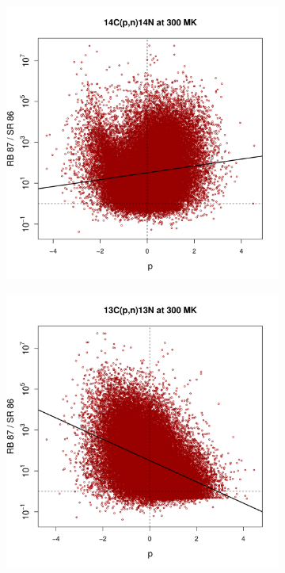 \begin{figure}[t]
\begin{subfigure}[b]{0.495\textwidth}
\end{subfigure}
\begin{subfigure}[b]{0.495\textwidth}   
\centering 
\includegraphics[width=\textwidth]{Chapter-3/figs/CorrRB87SR86_14C_p_n_14N_300MK.png}
\end{subfigure}
\hfill
\begin{subfigure}[b]{0.495\textwidth}   
\centering 
\includegraphics[width=\textwidth]{Chapter-3/figs/CorrRB87SR86_13C_p_n_13N_300MK.png}

\end{subfigure}
\end{figure}
